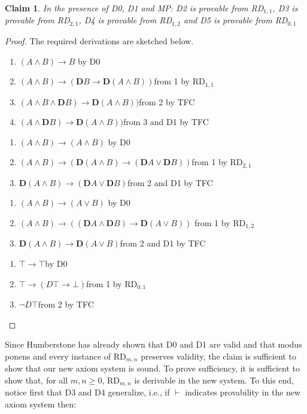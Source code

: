 \documentclass[11pt]{article}
\begin{document}
\newtheorem*{claim}{Claim}
\begin{claim}
In the presence of D0, D1 and MP: D2 is provable from RD$_{1,1}$, D3 is provable from RD$_{2,1}$, D4 is provable from RD$_{1,2}$ and D5 is provable from RD$_{0,1}$ 
\end{claim}
\begin{proof}
The required derivations are sketched below.
\begin{enumerate}
\item{$ (A\wedge B)\rightarrow B$ \tab\tab\tab by D0}
\item{$ (A\wedge B)\rightarrow (\mathbf{D}B\rightarrow \mathbf{D}(A\wedge B))$\tab from 1 by RD$_{1,1}$}
\item{$ (A\wedge B\wedge \mathbf{D}B)\rightarrow \mathbf{D}(A\wedge B))$\tab from 2 by TFC}
\item{$(A\wedge \mathbf{D}B)\rightarrow \mathbf{D}(A\wedge B))$\tab\tab from 3 and D1 by TFC}
\end{enumerate}
\medskip
\begin{enumerate}
\item{$ (A\wedge B)\rightarrow (A\wedge B)$ \tab\tab\tab by D0}
\item{$(A\wedge B)\rightarrow (\mathbf{D}(A\wedge B)\rightarrow (\mathbf{D}A\vee \mathbf{D}B))$\tab from 1 by RD$_{2,1}$}
\item{$ \mathbf{D}(A\wedge B)\rightarrow (\mathbf{D}A\vee \mathbf{D}B)$\tab\tab\tab from 2 and D1 by TFC}
\end{enumerate}
\medskip
\begin{enumerate}
\item{$ (A\wedge B)\rightarrow (A\vee B)$ \tab\tab\tab by D0}
\item{$ (A\wedge B)\rightarrow ((\mathbf{D}A\wedge \mathbf{D}B)\rightarrow \mathbf{D}(A\vee B))$ \tab from 1 by RD$_{1,2}$}
\item{$ \mathbf{D}(A\wedge B)\rightarrow \mathbf{D}(A\vee B)$\tab\tab\tab from 2 and D1 by TFC}
\end{enumerate}
\medskip
\begin{enumerate}
\item{$ \top \rightarrow \top $\tab\tab by D0}
\item{$ \top \rightarrow (D\top \rightarrow \bot)$\tab from 1 by RD$_{0,1}$}
\item{$ \neg D\top $\tab \tab from 2 by TFC}
\end{enumerate}
\end{proof}

Since Humberstone has already shown that D0 and D1 are valid and that modus ponens and every instance of RD$_{m,n}$ preserves validity, the claim is sufficient to show that our new axiom system is sound. 
To prove sufficiency, it is sufficient to show that, for all $m,n\!\ge\!0$, RD$_{m,n}$ is derivable in the new system. To this end, notice first that D3 and D4 generalize, i.e., if $\vdash $ indicates provability in the new axiom system then:
\end{document}
